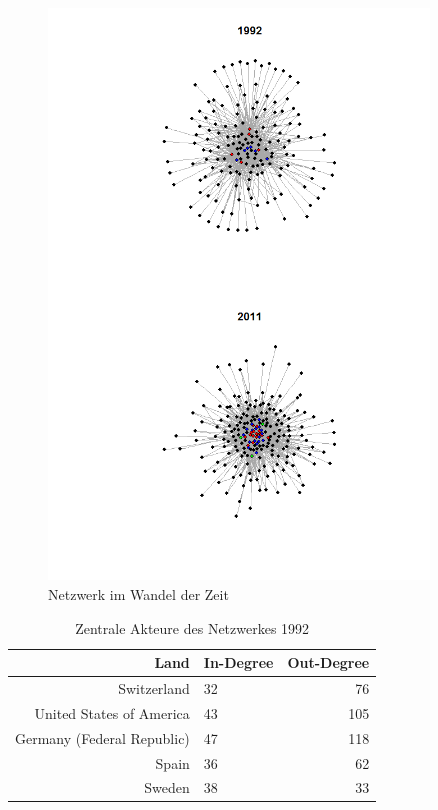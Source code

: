 \documentclass[a4paper,ngerman,oneside,titlepage,bibliography=totoc,11pt]{scrreprt}
\begin{document}
\begin{figure}[h]
	\centering
		\includegraphics[width=0.90\textwidth]{Grafiken/ts_network.png}
	\caption{Netzwerk im Wandel der Zeit}
	\label{fig:ts_network}
\end{figure}



\begin{table}[h]
\centering
\footnotesize
\begin{tabular}{rlr}
  \hline
 Land 											& In-Degree & Out-Degree\\ 
  \hline
 Switzerland 								& 32				& 76\\ 
 United States of America 	& 43				& 105\\ 
 Germany (Federal Republic) & 47				& 118\\ 
 Spain 											& 36				& 62\\ 
 Sweden 										& 38 				& 33\\ 
 

   \hline
\end{tabular}
\caption{Zentrale Akteure des Netzwerkes 1992} 
\label{top_1991}
	\end{table}
	
\end{document}

